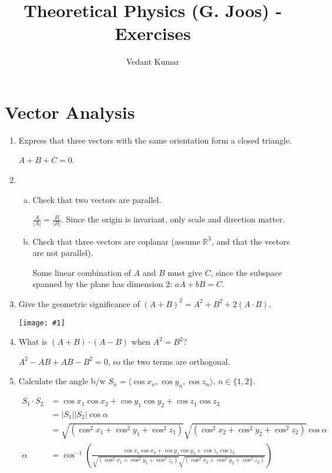 \documentclass{article}
\title{Theoretical Physics (G. Joos) - Exercises}
\author{Vedant Kumar}
\newcommand{\R}{\mathbb{R}}
\newcommand{\tuple}[1]{\langle #1 \rangle}
\newcommand{\centeredimage}[1]{\begin{center}\texttt{[image: \#1]}\end{center}}
\begin{document}
\maketitle

\section{Vector Analysis}

\begin{enumerate}[1)]
    \item Express that three vectors with the same orientation form a closed
        triangle.
        
        $A + B + C = 0$. 
    \item
        \begin{enumerate}[a)]
            \item Check that two vectors are parallel.
                
                $\frac{A}{|A|} = \frac{B}{|B|}$. Since the origin is
                invariant, only scale and direction matter.
            \item Check that three vectors are coplanar (assume $\R^3$, and
                that the vectors are not parallel).
                
                Some linear combination of $A$ and $B$ must give $C$, since
                the subspace spanned by the plane has dimension 2:
                $aA + bB = C$. 
        \end{enumerate}

    \item Give the geometric significance of
        $(A+B)^2 = A^2 + B^2 + 2(A \cdot B)$.

        \centeredimage{p1-3}

    \item What is $(A+B) \cdot (A-B)$ when $A^2=B^2$?

        $A^2 - AB + AB - B^2 = 0$, so the two terms are orthogonal.

    \item Calculate the angle b/w $S_n = \tuple{\cos x_n, \cos y_n, \cos
        z_n}$, $n \in \{1, 2\}$.

        \begin{align*}
            S_1 \cdot S_2 &=
                 \cos x_1\cos x_2 + \cos y_1\cos y_2 + \cos z_1\cos z_2 \\
                          &= |S_1||S_2|\cos \alpha \\
                          &= \sqrt{(\cos^2 x_1 + \cos^2 y_1 + \cos^2 z_1)}
                             \sqrt{(\cos^2 x_2 + \cos^2 y_2 + \cos^2 z_2)}
                             \cos \alpha \\
            \alpha &= \cos^{-1}\left( \frac{
                \cos x_1\cos x_2 + \cos y_1\cos y_2 + \cos z_1\cos z_2
            }{
                \sqrt{(\cos^2 x_1 + \cos^2 y_1 + \cos^2 z_1)}
                \sqrt{(\cos^2 x_2 + \cos^2 y_2 + \cos^2 z_2)}
            } \right)
        \end{align*}


\end{enumerate}
\end{document}
